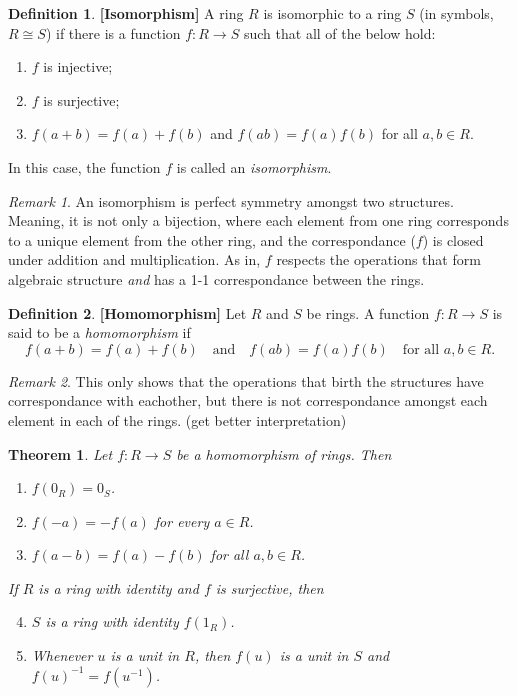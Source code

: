 \documentclass{article}
\newtheorem{theorem}{Theorem}[section]
\theoremstyle{definition}
\newtheorem{definition}{Definition}[section]
\theoremstyle{remark}
\newtheorem{remark}{Remark}[section]
\begin{document}
\begin{definition}\textbf{[Isomorphism]}
A ring $R$ is isomorphic to a ring $S$ (in symbols, $R \cong S$) if there is a function $f: R \to S$ such that all of the below hold:
\begin{enumerate}
\item $f$ is injective;
\item $f$ is surjective;
\item $f(a + b) = f(a) + f(b)$ \quad and \quad $f(ab) = f(a) f(b)$ for all $a, b \in R$.
\end{enumerate}
In this case, the function $f$ is called an \textit{isomorphism}.
\end{definition}
\begin{remark}
An isomorphism is perfect symmetry amongst two structures.
Meaning, it is not only a bijection, where each element from one ring corresponds to 
a unique element from the other ring, and the correspondance ($f$) is closed 
under addition and multiplication. As in, $f$ respects the operations 
that form algebraic structure \textit{and} has a 1-1 correspondance between the rings.
\end{remark}


\begin{definition}\textbf{[Homomorphism]}
Let $R$ and $S$ be rings. A function $f: R \to S$ is said to be a \textit{homomorphism} if
\[
f(a + b) = f(a) + f(b) \quad \text{and} \quad f(ab) = f(a) f(b) \quad \text{for all } a, b \in R.
\]
\end{definition}

\begin{remark}
This only shows that the operations that birth the structures
have correspondance with eachother, but there is not correspondance amongst
each element in each of the rings. (get better interpretation)
\end{remark}








\begin{theorem}\label{thm:homomorphism property}
Let $f: R \to S$ be a homomorphism of rings. Then
\begin{enumerate}
\item $f(0_R) = 0_S$.
\item $f(-a) = -f(a)$ for every $a \in R$.
\item $f(a - b) = f(a) - f(b)$ for all $a, b \in R$.
\end{enumerate}
If $R$ is a ring with identity and $f$ is surjective, then
\begin{enumerate}
\setcounter{enumi}{3}
\item $S$ is a ring with identity $f(1_R)$.
\item Whenever $u$ is a unit in $R$, then $f(u)$ is a unit in $S$ and $f(u)^{-1} = f(u^{-1})$.
\end{enumerate}
\end{theorem}                
\end{document}
